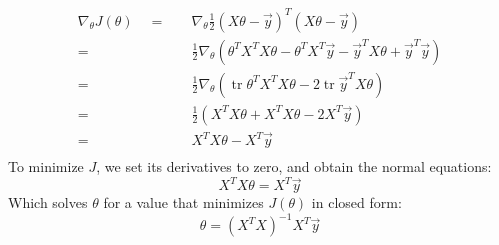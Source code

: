 \documentclass[twoside,twocolumn]{article}
\begin{document}
\begin{equation}
  \begin{split}
    \nabla _ { \theta } J ( \theta ) \quad =& \quad \nabla _ { \theta } \frac { 1 } { 2 } ( X \theta - \vec { y } ) ^ { T } ( X \theta - \vec { y } ) \\
    =& \quad \frac { 1 } { 2 } \nabla _ { \theta } \left( \theta ^ { T } X ^ { T } X \theta - \theta ^ { T } X ^ { T } \vec { y } - \vec { y } ^ { T } X \theta + \vec { y } ^ { T } \vec { y } \right) \\
    =& \quad \frac { 1 } { 2 } \nabla _ { \theta } \left( \operatorname { tr } \theta ^ { T } X ^ { T } X \theta - 2 \operatorname { tr } \vec { y } ^ { T } X \theta \right) \\
    =& \quad \frac { 1 } { 2 } \left( X ^ { T } X \theta + X ^ { T } X \theta - 2 X ^ { T } \vec { y } \right) \\
    =& \quad X ^ { T } X \theta - X ^ { T } \vec { y } \\
  \end{split}
\end{equation}
To minimize $J$, we set its derivatives to zero, and obtain the normal
equations:
\begin{equation}
  X ^ { T } X \theta = X ^ { T } \vec { y }
\end{equation}
Which solves $\theta$ for a value that minimizes $J(\theta)$ in closed form:
\begin{equation}
  \theta = \left( X ^ { T } X \right) ^ { - 1 } X ^ { T } \vec { y }
\end{equation}
\end{document}
